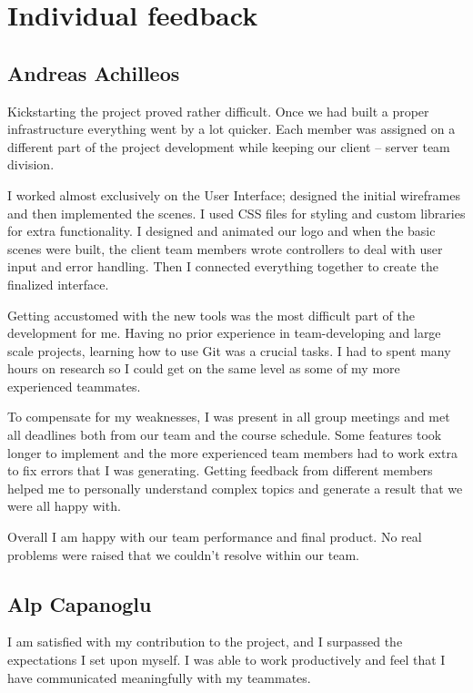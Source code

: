 \chapter{Individual feedback}\label{ch:individual-feedback}

\section{Andreas Achilleos}
Kickstarting the project proved rather difficult. Once we had built a proper infrastructure 
everything went by a lot quicker. Each member was assigned on a different part of the project development while 
keeping our client – server team division. 

I worked almost exclusively on the User Interface; designed the initial wireframes and then implemented the scenes.
I used CSS files for styling and custom libraries for extra functionality.
I designed and animated our logo and when the basic scenes were built, the client team members wrote controllers to 
deal with user input and error handling. Then I connected everything together to create the finalized interface.

Getting accustomed with the new tools was the most difficult part of the development for me. Having no prior 
experience in team-developing and large scale projects, learning how to use Git was a crucial tasks. 
I had to spent many hours on research so I could get on the same level as some of my more experienced teammates. 

To compensate for my weaknesses, I was present in all group meetings and met all deadlines both from our team 
and the course schedule. Some features took longer to implement and the more experienced team members had to work
extra to fix errors that I was generating. Getting feedback from different members helped me to personally understand 
complex topics and generate a result that we were all happy with.

Overall I am happy with our team performance and final product. No real problems were raised that 
we couldn't resolve within our team.
  

\section{Alp Capanoglu}
I am satisfied with my contribution to the project, and I surpassed the expectations I set upon myself.
I was able to work productively and feel that I have communicated meaningfully with my teammates.


